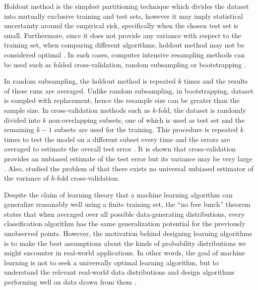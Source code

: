 \documentclass[letterpaper]{article}
\begin{document}
Holdout method is the simplest partitioning technique which divides the dataset into mutually exclusive training and test sets, however it may imply statistical uncertainty around the empirical risk, specifically when the chosen test set is small. Furthermore, since it does not provide any variance with respect to the training set, when comparing different algorithms, holdout method may not be considered optimal \cite{Dietterich98}. In such cases, computer intensive resampling methods can be used such as folded cross-validation, random subsampling or bootstrapping \cite{Kohavi95}.

In random subsampling, the holdout method is repeated $k$ times and the results of these runs are averaged. Unlike random subsampling, in bootstrapping, dataset is sampled with replacement, hence the resample size can be greater than the sample size. In cross-validation methods such as $k$-fold, the dataset is randomly divided into $k$ non-overlapping subsets, one of which is used as test set and the remaining $k-1$ subsets are used for the training. This procedure is repeated $k$ times to test the model on a different subset every time and the errors are averaged to estimate the overall test error \cite{Kohavi95}. It is shown that cross-validation provides an unbiased estimate of the test error but its variance may be very large \cite{Breiman96}. Also, \cite{BengioG04} studied the problem of that there exists no universal unbiased estimator of the variance of $k$-fold cross-validation.

Despite the claim of learning theory that a machine learning algorithm can generalize reasonably well using a finite training set, the ``no free lunch'' theorem \cite{wolpert1996lack} states that when averaged over all possible data-generating distributions, every classification algorithm has the same generalization potential for the previously unobserved points. However, the motivation behind designing learning algorithms is to make the best assumptions about the kinds of probability distributions we might encounter in real-world applications. In other words, the goal of machine learning is not to seek a universally optimal learning algorithm, but to understand the relevant real-world data distributions and design algorithms performing well on data drawn from them \cite{Goodfellow-et-al-2016}.
\end{document}
